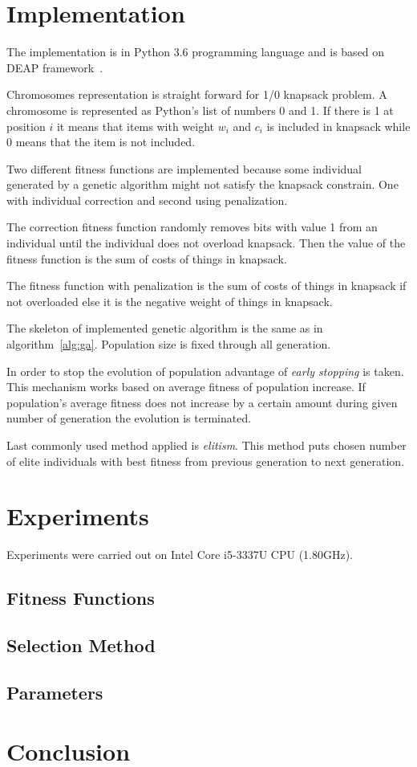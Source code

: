 \documentclass{article}
\begin{document}
\section{Implementation}

The implementation is in Python 3.6 programming language
and is based on DEAP framework~\cite{fortin2012}.

Chromosomes representation is straight forward for 1/0 knapsack problem.
A chromosome is represented as Python's list of numbers 0 and 1.
If there is 1 at position $i$ it means that items with weight $w_i$ and $c_i$
is included in knapsack while 0 means that the item is not included.

Two different fitness functions are implemented
because some individual generated by a genetic algorithm might not satisfy
the knapsack constrain.
One with individual correction and second using penalization.

The correction fitness function randomly removes bits with value 1
from an individual until the individual does not overload knapsack.
Then the value of the fitness function is the sum of costs of things
in knapsack.

The fitness function with penalization is the sum of costs of things
in knapsack if not overloaded else it is the negative weight of things
in knapsack.

The skeleton of implemented genetic algorithm is the same as
in algorithm~\ref{alg:ga}.
Population size is fixed through all generation.

In order to stop the evolution of population advantage of
\textit{early stopping} is taken.
This mechanism works based on average fitness of population increase.
If population's average fitness does not increase by a certain amount
during given number of generation the evolution is terminated.

Last commonly used method applied is \textit{elitism}.
This method puts chosen number of elite individuals with best fitness
from previous generation to next generation.

\section{Experiments}

Experiments were carried out on Intel Core i5-3337U CPU (1.80GHz).

\subsection{Fitness Functions}

\subsection{Selection Method}

\subsection{Parameters}

\section{Conclusion}




\end{document}
